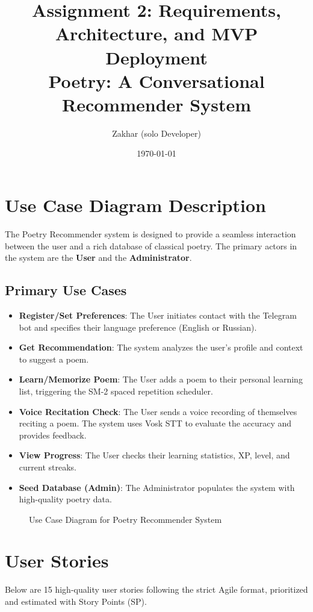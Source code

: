 \documentclass[12pt,a4paper]{article}
\title{Assignment 2: Requirements, Architecture, and MVP Deployment \\ \large Poetry: A Conversational Recommender System}
\author{Zakhar (solo Developer)}
\date{\today}
\begin{document}
\maketitle

\tableofcontents
\newpage

\section{Use Case Diagram Description}
The Poetry Recommender system is designed to provide a seamless interaction between the user and a rich database of classical poetry. The primary actors in the system are the \textbf{User} and the \textbf{Administrator}.

\subsection{Primary Use Cases}
\begin{itemize}
    \item \textbf{Register/Set Preferences}: The User initiates contact with the Telegram bot and specifies their language preference (English or Russian).
    \item \textbf{Get Recommendation}: The system analyzes the user's profile and context to suggest a poem.
    \item \textbf{Learn/Memorize Poem}: The User adds a poem to their personal learning list, triggering the SM-2 spaced repetition scheduler.
    \item \textbf{Voice Recitation Check}: The User sends a voice recording of themselves reciting a poem. The system uses Vosk STT to evaluate the accuracy and provides feedback.
    \item \textbf{View Progress}: The User checks their learning statistics, XP, level, and current streaks.
    \item \textbf{Seed Database (Admin)}: The Administrator populates the system with high-quality poetry data.
\end{itemize}

\begin{figure}[h]
    \centering
    \caption{Use Case Diagram for Poetry Recommender System}
    \label{fig:usecase}
\end{figure}

\newpage
\section{User Stories}
Below are 15 high-quality user stories following the strict Agile format, prioritized and estimated with Story Points (SP).
\end{document}
